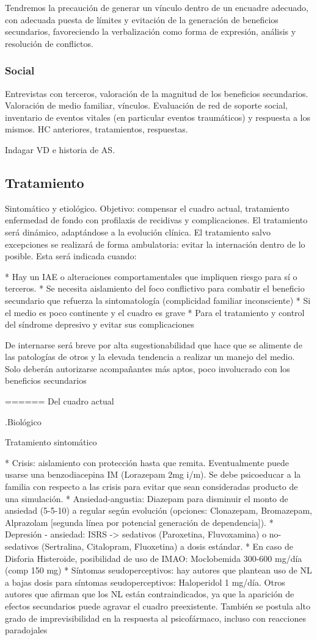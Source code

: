 Tendremos la precaución de generar un vínculo dentro de un encuadre adecuado, con adecuada puesta de límites y evitación de la generación de beneficios secundarios, favoreciendo la verbalización como forma de expresión, análisis y resolución de conflictos.
\subsubsection*{Social}
Entrevistas con terceros, valoración de la magnitud de los beneficios secundarios. Valoración de medio familiar, vínculos. Evaluación de red de soporte social, inventario de eventos vitales (en particular eventos traumáticos) y respuesta a los mismos. HC anteriores, tratamientos, respuestas.

Indagar VD e historia de AS.
\subsection*{Tratamiento}
Sintomático y etiológico. Objetivo: compensar el cuadro actual, tratamiento enfermedad de fondo con profilaxis de recidivas y complicaciones. El tratamiento será dinámico, adaptándose a la evolución clínica.
El tratamiento salvo excepciones se realizará de forma ambulatoria: evitar la internación dentro de lo posible. Esta será indicada cuando:

* Hay un IAE o alteraciones comportamentales que impliquen riesgo para sí o terceros.
* Se necesita aislamiento del foco conflictivo para combatir el beneficio secundario que refuerza la sintomatología (complicidad familiar inconsciente)
* Si el medio es poco continente y el cuadro es grave
* Para el tratamiento y control del síndrome depresivo y evitar sus complicaciones

De internarse será breve por alta sugestionabilidad que hace que se alimente de las patologías de otros y la elevada tendencia a realizar un manejo del medio. Solo deberán autorizarse acompañantes más aptos, poco involucrado con los beneficios secundarios

====== Del cuadro actual

.Biológico

Tratamiento sintomático

* Crisis: aislamiento con protección hasta que remita. Eventualmente puede usarse una benzodiacepina IM (Lorazepam 2mg i/m). Se debe psicoeducar a la familia con respecto a las crisis para evitar que sean consideradas producto de una simulación.
* Ansiedad-angustia: Diazepam para disminuir el monto de ansiedad (5-5-10) a regular según evolución (opciones: Clonazepam, Bromazepam, Alprazolam [segunda línea por potencial generación de dependencia]).
* Depresión - ansiedad: ISRS -> sedativos (Paroxetina, Fluvoxamina) o no-sedativos (Sertralina, Citalopram, Fluoxetina) a dosis estándar.
* En caso de Disforia Histeroide, posibilidad de uso de IMAO: Moclobemida 300-600 mg/día (comp 150 mg) 
* Síntomas seudoperceptivos: hay autores que plantean uso de NL a bajas dosis para síntomas seudoperceptivos: Haloperidol 1 mg/día. Otros autores que afirman que los NL están contraindicados, ya que la aparición de efectos secundarios puede agravar el cuadro preexistente. También se postula alto grado de imprevisibilidad en la respuesta al psicofármaco, incluso con reacciones paradojales

